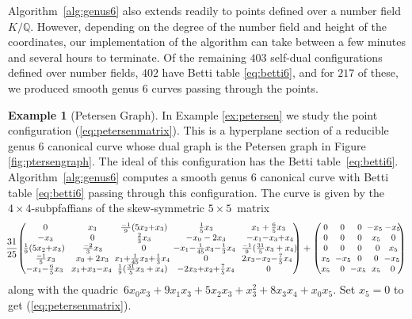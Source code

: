 \documentclass[12pt]{extarticle}
\theoremstyle{definition}
\newtheorem{example}[theorem]{Example}
\numberwithin{theorem}{section}
\theoremstyle{plain}\newtheorem{ithm}{Theorem}
\newcommand{\QQ}{\mathbb{Q}}
\begin{document}
Algorithm~\ref{alg:genus6} also extends readily to points defined over a number field $K/\QQ$. However, depending on the degree of the number field and height of the coordinates, our implementation of the algorithm can take between a few minutes and several hours
to  terminate. Of the remaining $403$ self-dual configurations defined over number fields, $402$ have Betti table \eqref{eq:betti6}, and for $217$ of these, we produced smooth genus $6$ curves passing through the points. 


\begin{example}[Petersen Graph]
In Example \ref{ex:petersen}  we study the point configuration 
 (\ref{eq:petersenmatrix}). This is a 
 hyperplane section of a reducible genus $6$ canonical curve whose dual graph is the Petersen graph in Figure \ref{fig:ptersengraph}.
 The ideal of this configuration has the Betti table~\eqref{eq:betti6}. Algorithm~\ref{alg:genus6}
  computes a smooth  genus $6$ canonical curve with Betti table \eqref{eq:betti6} passing through this configuration.
 The curve is given by the  $4 \times 4$-subpfaffians of the skew-symmetric
 $5  \times 5$~matrix 
 $$ 
\begin{small} \!\!
 \frac{31}{25} \! \begin{pmatrix}
0& x_3&\!\! \frac{-1}{9}(5x_2{+}x_3)\!\!& \frac{1}{5}x_3& x_1+ \frac{6}{5}x_3 \\
-x_3& 0& \frac{2}{3}x_3& -x_0-2x_3& -x_1{-}x_3{+}x_4 \!\! \\
 \! \! \frac{1}{9}(5x_2{+}x_3)& \frac{-2}{3}x_3& 0&\!\!\!\! -x_1{-}\frac{1}{45}x_3{-}\frac{1}{3}x_4 \!\! & \!\! \frac{-1}{9} (\frac{31}{5}x_3+x_4) \!\!\! \\
 \frac{-1}{5}x_3& x_0+2x_3& \!\! \!\! x_1{+}\frac{1}{45}x_3{+}\frac{1}{3}x_4 \!\! & 0& \!\! 2x_3{-}x_2{-}\frac{7}{5}x_4\\
 \! -x_1{-}\frac{6}{5}x_3&\! \! x_1{+}x_3{-}x_4 \!& \!\! \frac{1}{9} (\frac{31}{5}x_3+x_4)& {-}2x_3{+}x_2{+}\frac{7}{5}x_4& 0 
        \end{pmatrix} +
        \begin{pmatrix}
0 & \!\! 0 & \!\! 0 & \!\!\! \! \! -x_5 \! &\!\!\!\! - x_5\!\! \\
0 &\!\! 0 & \!\! 0 &\!\! x_5 &\!\! 0 \!\\
0 & \!\! 0 & \!\! 0 & \!\!\ 0 & \!\!x_5 \!\\
x_5 & \!\!\! -x_5 \!\! & \!\! 0 &\!\! 0 & \!\!\!\!\!\! -x_5 \!\! \! \\
x_5 & \!\! 0 &\!\!\!\! \! -x_5 \! &\!\! x_5 &\!\!  0 
        \end{pmatrix}
        \end{small}
$$
along with the  quadric
$\,6x_0x_3+9x_1x_3+5x_2x_3+x_3^2+8x_3x_4+x_0x_5 $.
Set $x_5=0$ to get (\ref{eq:petersenmatrix}).
\end{example}
\end{document}
